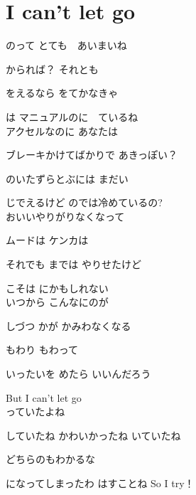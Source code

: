 \section{ I can't let go}
\large{

のって とても　あいまいね

かられば？ それとも

をえるなら をてかなきゃ

は マニュアルのに　ているね
\\

アクセルなのに あなたは

ブレーキかけてばかりで あきっぽい？

のいたずらとぶには まだい

じでえるけど のでは冷めているの?
\\

おいいやりがりなくなって

ムードは ケンカは

それでも までは やりせたけど

こそは にかもしれない
\\

いつから こんなにのが

しづつ かが かみわなくなる

もわり もわって

いったいを めたら いいんだろう

But I can't let go
\\

  っていたよね

していたね かわいかったね いていたね

どちらのもわかるな

になってしまったわ はすことね So I try！

}